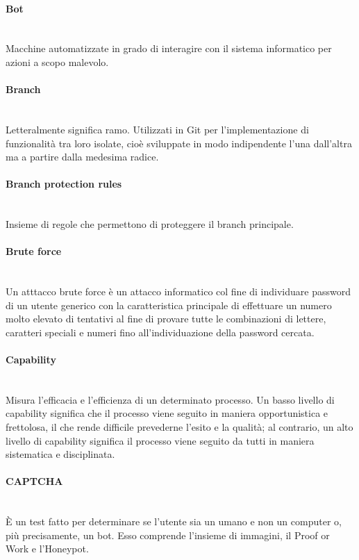 \paragraph{Bot}~\smallskip \\
Macchine automatizzate in grado di interagire con il sistema informatico per azioni a scopo malevolo.

\paragraph{Branch}~\smallskip \\
Letteralmente significa ramo. Utilizzati in Git per l'implementazione di funzionalità tra loro isolate, cioè sviluppate in modo indipendente l'una dall'altra ma a partire dalla medesima radice.

\paragraph{Branch protection rules}~\smallskip \\
Insieme di regole che permettono di proteggere il branch principale.

\paragraph{Brute force}~\smallskip \\
Un atttacco brute force è un attacco informatico col fine di individuare password di un utente generico con la caratteristica principale di effettuare un numero molto elevato di tentativi al fine di provare tutte le combinazioni di lettere, caratteri speciali e numeri fino all'individuazione della password cercata.

\paragraph{Capability}~\smallskip \\
Misura l'efficacia e l'efficienza di un determinato processo. Un basso livello di capability significa che il processo viene seguito in maniera opportunistica e frettolosa, il che rende difficile prevederne l'esito e la qualità; al contrario, un alto livello di capability significa il processo viene seguito da tutti in maniera sistematica e disciplinata.

\paragraph{CAPTCHA}~\smallskip \\
È un test fatto per determinare se l'utente sia un umano e non un computer o, più precisamente, un bot.
Esso comprende l'insieme di immagini, il Proof or Work e l'Honeypot.

